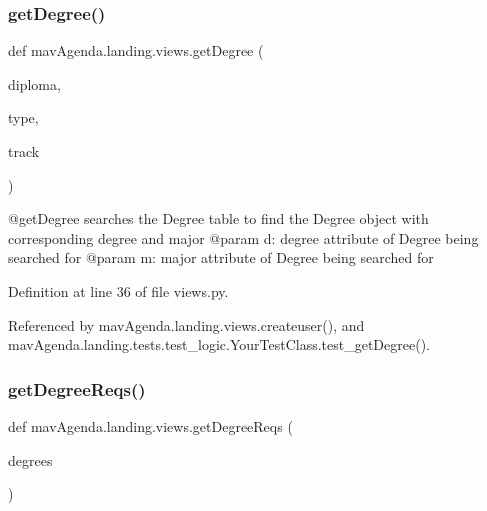 \mbox{\label{namespacemavAgenda_1_1landing_1_1views_a092514b579e6413adfe4dcc1ec5f5a81}} 
\subsubsection{\texorpdfstring{get\+Degree()}{getDegree()}}
{\footnotesize\ttfamily def mav\+Agenda.\+landing.\+views.\+get\+Degree (\begin{DoxyParamCaption}\item[{}]{diploma,  }\item[{}]{type,  }\item[{}]{track }\end{DoxyParamCaption})}

\begin{DoxyVerb}@getDegree searches the Degree table to find the Degree object with corresponding degree and major
@param d: degree attribute of Degree being searched for
@param m: major attribute of Degree being searched for
\end{DoxyVerb}
 

Definition at line 36 of file views.\+py.



Referenced by mav\+Agenda.\+landing.\+views.\+createuser(), and mav\+Agenda.\+landing.\+tests.\+test\+\_\+logic.\+Your\+Test\+Class.\+test\+\_\+get\+Degree().

\mbox{\label{namespacemavAgenda_1_1landing_1_1views_a744df9b524faa76fa7949ae1bb839cee}} 
\subsubsection{\texorpdfstring{get\+Degree\+Reqs()}{getDegreeReqs()}}
{\footnotesize\ttfamily def mav\+Agenda.\+landing.\+views.\+get\+Degree\+Reqs (\begin{DoxyParamCaption}\item[{}]{degrees }\end{DoxyParamCaption})}

